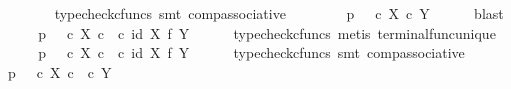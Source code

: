 \begin{isabellebody}
\ \ \ \ \ \ \isamarkupfalse%
\ {\isacharparenleft}{\kern0pt}typecheck{\isacharunderscore}{\kern0pt}cfuncs{\isacharcomma}{\kern0pt}\ smt\ comp{\isacharunderscore}{\kern0pt}associative{}{\isacharparenright}{\kern0pt}\isanewline
\ \ \isamarkupfalse%
\isanewline
\ \ \isamarkupfalse%
\ \isamarkupfalse%
\ {\isachardoublequoteopen}p\isactrlsup {\isasymsharp}\ {\isacharequal}{\kern0pt}\ {\isacharparenleft}{\kern0pt}{\isasymt}\ {\isasymcirc}\isactrlsub c\ {\isasymbeta}\isactrlbsub X\ {\isasymtimes}\isactrlsub c\ Y\isactrlesub {\isacharparenright}{\kern0pt}\isactrlsup {\isasymsharp}{\isachardoublequoteclose}\isanewline
\ \ \ \ \isamarkupfalse%
\ blast\isanewline
\ \ \isamarkupfalse%
\ \isamarkupfalse%
\ {\isachardoublequoteopen}p\isactrlsup {\isasymsharp}\ {\isacharequal}{\kern0pt}\ {\isacharparenleft}{\kern0pt}{\isasymt}\ {\isasymcirc}\isactrlsub c\ {\isasymbeta}\isactrlbsub X\ {\isasymtimes}\isactrlsub c\ {\isasymone}\isactrlesub \ {\isasymcirc}\isactrlsub c\ {\isacharparenleft}{\kern0pt}id\ X\ {\isasymtimes}\isactrlsub f\ {\isasymbeta}\isactrlbsub Y\isactrlesub {\isacharparenright}{\kern0pt}{\isacharparenright}{\kern0pt}\isactrlsup {\isasymsharp}{\isachardoublequoteclose}\isanewline
\ \ \ \ \isamarkupfalse%
\ {\isacharparenleft}{\kern0pt}typecheck{\isacharunderscore}{\kern0pt}cfuncs{\isacharcomma}{\kern0pt}\ metis\ terminal{\isacharunderscore}{\kern0pt}func{\isacharunderscore}{\kern0pt}unique{\isacharparenright}{\kern0pt}\isanewline
\ \ \isamarkupfalse%
\ \isamarkupfalse%
\ {\isachardoublequoteopen}p\isactrlsup {\isasymsharp}\ {\isacharequal}{\kern0pt}\ {\isacharparenleft}{\kern0pt}{\isacharparenleft}{\kern0pt}{\isasymt}\ {\isasymcirc}\isactrlsub c\ {\isasymbeta}\isactrlbsub X\ {\isasymtimes}\isactrlsub c\ {\isasymone}\isactrlesub {\isacharparenright}{\kern0pt}\ {\isasymcirc}\isactrlsub c\ {\isacharparenleft}{\kern0pt}id\ X\ {\isasymtimes}\isactrlsub f\ {\isasymbeta}\isactrlbsub Y\isactrlesub {\isacharparenright}{\kern0pt}{\isacharparenright}{\kern0pt}\isactrlsup {\isasymsharp}{\isachardoublequoteclose}\isanewline
\ \ \ \ \isamarkupfalse%
\ {\isacharparenleft}{\kern0pt}typecheck{\isacharunderscore}{\kern0pt}cfuncs{\isacharcomma}{\kern0pt}\ smt\ comp{\isacharunderscore}{\kern0pt}associative{}{\isacharparenright}{\kern0pt}\isanewline
\ \ \isamarkupfalse%
\ \isamarkupfalse%
\ {\isachardoublequoteopen}p\isactrlsup {\isasymsharp}\ {\isacharequal}{\kern0pt}\ {\isacharparenleft}{\kern0pt}{\isasymt}\ {\isasymcirc}\isactrlsub c\ {\isasymbeta}\isactrlbsub X\ {\isasymtimes}\isactrlsub c\ {\isasymone}\isactrlesub {\isacharparenright}{\kern0pt}\isactrlsup {\isasymsharp}\ {\isasymcirc}\isactrlsub c\ {\isasymbeta}\isactrlbsub Y\isactrlesub {\isachardoublequoteclose}\isanewline

\end{isabellebody}
